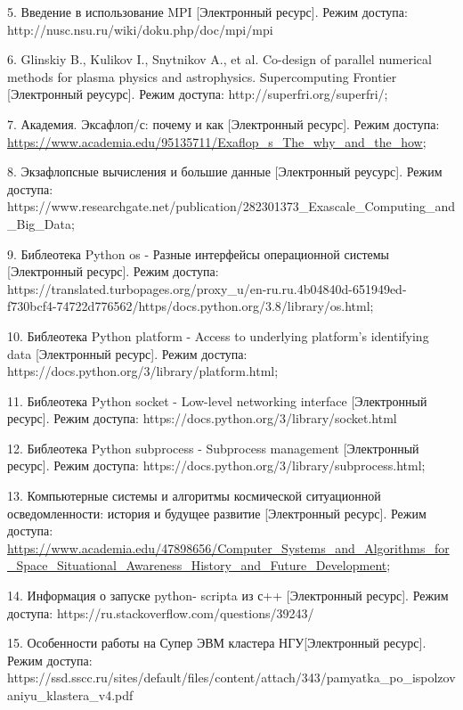 \documentclass{article}
\begin{document}
5. Введение в использование MPI [Электронный ресурс]. Режим доступа: http://nusc.nsu.ru/wiki/doku.php/doc/mpi/mpi

6. Glinskiy B., Kulikov I., Snytnikov A., et al. Co-design of parallel numerical methods for plasma physics and astrophysics. Supercomputing Frontier [Электронный реусурс]. Режим доступа: http://superfri.org/superfri/;

7. Академия. Эксафлоп/с: почему и как [Электронный ресурс].
Режим доступа: \href{https://www.academia.edu/95135711/Exaflop_s_The_why_and_the_how}{https://www.academia.edu/95135711/Exaflop\_s\_The\_why\_and\_the\_how};

8. Экзафлопсные вычисления и большие данные [Электронный реусурс]. Режим доступа: 
https://www.researchgate.net/publication/282301373\_Exascale\_Computing\_and\_Big\_Data;

9.  Библеотека Python os - Разные интерфейсы операционной системы [Электронный ресурс]. Режим доступа: https://translated.turbopages.org/proxy_u/en-ru.ru.4b04840d-651949ed-f730bcf4-74722d776562/https/docs.python.org/3.8/library/os.html;

10.  Библеотека Python platform - Access to underlying platform’s identifying data [Электронный ресурс]. Режим доступа: https://docs.python.org/3/library/platform.html;

11. Библеотека Python socket - Low-level networking interface [Электронный ресурс]. Режим доступа: https://docs.python.org/3/library/socket.html

12. Библеотека Python subprocess - Subprocess management  [Электронный ресурс]. Режим доступа: https://docs.python.org/3/library/subprocess.html;

13. Компьютерные системы и алгоритмы космической ситуационной осведомленности: история и будущее развитие [Электронный ресурс].
Режим доступа: \href{https://www.academia.edu/47898656/Computer_Systems_and_Algorithms_for_Space_Situational_Awareness_History_and_Future_Development}{https://www.academia.edu/47898656/Computer\_Systems\_and\_Algorithms\_for\_Space\_Situational\_Awareness\_History\_and\_Future\_Development};

14. Информация о запуске python- scripta из с++ [Электронный ресурс]. Режим доступа: https://ru.stackoverflow.com/questions/39243/

15. Особенности работы на Супер ЭВМ кластера НГУ[Электронный ресурс]. Режим доступа: https://ssd.sscc.ru/sites/default/files/content/attach/343/pamyatka_po_ispolzovaniyu_klastera_v4.pdf
\end{document}
